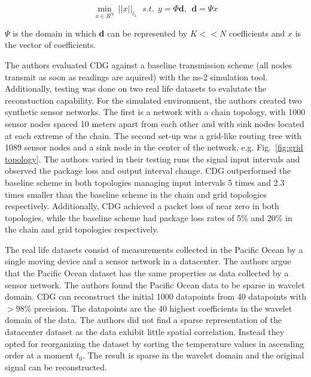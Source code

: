 $$
\displaystyle{\min_{x\in R^N} \ ||x||_{l_1}}  \ \ \   s.t.  \ \  y = \Phi \textbf{d} , \ \ 
\textbf{d}  = \Psi x
$$

$ \Psi $ is the domain in which \textbf{d} can be represented by $ K << N
$ coefficients and $ x $ is the vector of coefficients.

The authors evaluated \ac{CDG} against a baseline transmission scheme (all
nodes transmit as soon as readings are aquired) with the ns-2 simulation tool.
Additionally, testing was done on two real life datasets to evalutate the
reconstuction capability. For the simulated environment, the authors created
two synthetic sensor networks. The first is a network with a chain topology,
with 1000 sensor nodes spaced 10 meters apart from each other and with sink
nodes located at each extreme of the chain. The second set-up was a grid-like
routing tree with 1089 sensor nodes and a sink node in the center of the
network, e.g. Fig.~\ref{fig:grid topology}. The authors varied in their testing
runs the signal input intervals and observed the package loss and output
interval change. \ac{CDG} outperformed the baseline scheme in both topologies
managing input intervals 5 times and 2.3 times smaller than the baseline scheme
in the chain and grid topologies respectively. Additionally, \ac{CDG} achieved
a packet loss of near zero in both topologies, while the baseline scheme had
package loss rates of 5\% and 20\% in the chain and grid topologies
respectively.

The real life datasets consist of measurements collected in the Pacific Ocean
by a single moving device and a sensor network in a datacenter. The authors
argue that the Pacific Ocean dataset has the same properties as data collected
by a sensor network. The authors found the Pacific Ocean data to be sparse in
wavelet domain. \ac{CDG} can reconstruct the initial 1000 datapoints from 40
datapoints with $ > 98\% $ precision. The datapoints are the 40 highest
coefficients in the wavelet domain of the data. The authors did not find a
sparse representation of the datacenter dataset as the data exhibit little
spatial correlation. Instead they opted for reorganizing the dataset by sorting
the temperature values in ascending order at a moment $ t_0 $. The result is
sparse in the wavelet domain and the original signal can be reconstructed.


